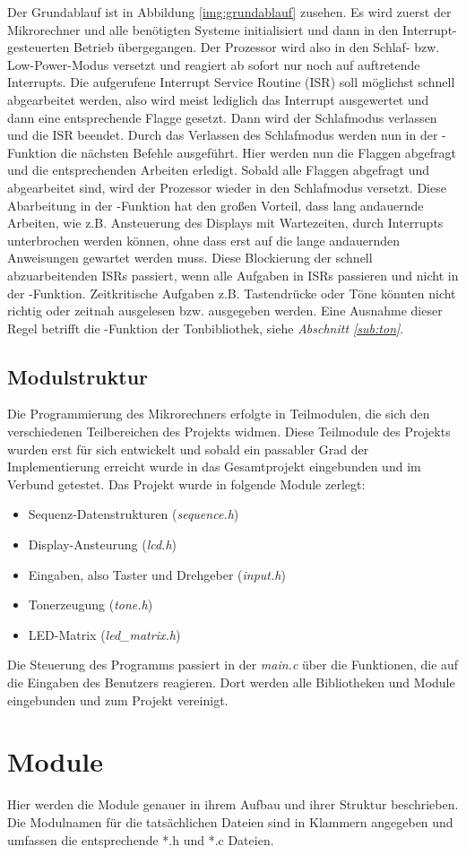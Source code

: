 \newline
Der Grundablauf ist in Abbildung \ref{img:grundablauf} zusehen. Es wird zuerst der Mikrorechner und alle benötigten Systeme initialisiert und dann in den Interrupt-gesteuerten Betrieb übergegangen. Der Prozessor wird also in den Schlaf- bzw. Low-Power-Modus versetzt und reagiert ab sofort nur noch auf auftretende Interrupts. Die aufgerufene Interrupt Service Routine (ISR) soll möglichst schnell abgearbeitet werden, also wird meist lediglich das Interrupt ausgewertet und dann eine entsprechende Flagge gesetzt. Dann wird der Schlafmodus verlassen und die ISR beendet. Durch das Verlassen des Schlafmodus werden nun in der -Funktion die nächsten Befehle ausgeführt. Hier werden nun die Flaggen abgefragt und die entsprechenden Arbeiten erledigt. Sobald alle Flaggen abgefragt und abgearbeitet sind, wird der Prozessor wieder in den Schlafmodus versetzt. Diese Abarbeitung in der -Funktion hat den großen Vorteil, dass lang andauernde Arbeiten, wie z.B. Ansteuerung des Displays mit Wartezeiten, durch Interrupts unterbrochen werden können, ohne dass erst auf die lange andauernden Anweisungen gewartet werden muss. Diese Blockierung der schnell abzuarbeitenden ISRs passiert, wenn alle Aufgaben in ISRs passieren und nicht in der -Funktion. Zeitkritische Aufgaben z.B. Tastendrücke oder Töne könnten nicht richtig oder zeitnah ausgelesen bzw. ausgegeben werden. Eine Ausnahme dieser Regel betrifft die -Funktion der Tonbibliothek, siehe \textsl{Abschnitt \ref{sub:ton}}.

\subsection{Modulstruktur}
Die Programmierung des Mikrorechners erfolgte in Teilmodulen, die sich den verschiedenen Teilbereichen des Projekts widmen. Diese Teilmodule des Projekts wurden erst für sich entwickelt und sobald ein passabler Grad der Implementierung erreicht wurde in das Gesamtprojekt eingebunden und im Verbund getestet. Das Projekt wurde in folgende Module zerlegt:
\begin{itemize}
    \item Sequenz-Datenstrukturen (\textsl{sequence.h})
	\item Display-Ansteurung (\textsl{lcd.h})
	\item Eingaben, also Taster und Drehgeber (\textsl{input.h})
	\item Tonerzeugung (\textsl{tone.h})
	\item LED-Matrix (\textsl{led\_matrix.h})
\end{itemize}
Die Steuerung des Programms passiert in der \textsl{main.c} über die Funktionen, die auf die Eingaben des Benutzers reagieren. Dort werden alle Bibliotheken und Module eingebunden und zum Projekt vereinigt.

\section{Module}
Hier werden die Module genauer in ihrem Aufbau und ihrer Struktur beschrieben. Die Modulnamen für die tatsächlichen Dateien sind in Klammern angegeben und umfassen die entsprechende *.h und *.c Dateien.
